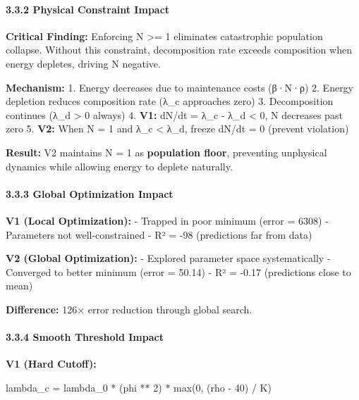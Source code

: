 \documentclass[
]{article}
\newenvironment{Shaded}{}{}
\newcommand{\BuiltInTok}[1]{\textcolor[rgb]{0.00,0.50,0.00}{#1}}
\newcommand{\DecValTok}[1]{\textcolor[rgb]{0.25,0.63,0.44}{#1}}
\newcommand{\NormalTok}[1]{#1}
\newcommand{\OperatorTok}[1]{\textcolor[rgb]{0.40,0.40,0.40}{#1}}
\begin{document}
\paragraph{3.3.2 Physical Constraint
Impact}\label{physical-constraint-impact}

\textbf{Critical Finding:} Enforcing N \textgreater= 1 eliminates
catastrophic population collapse. Without this constraint, decomposition
rate exceeds composition when energy depletes, driving N negative.

\textbf{Mechanism:} 1. Energy decreases due to maintenance costs (β·N·ρ)
2. Energy depletion reduces composition rate (λ\_c approaches zero) 3.
Decomposition continues (λ\_d \textgreater{} 0 always) 4. \textbf{V1:}
dN/dt = λ\_c - λ\_d \textless{} 0, N decreases past zero 5. \textbf{V2:}
When N = 1 and λ\_c \textless{} λ\_d, freeze dN/dt = 0 (prevent
violation)

\textbf{Result:} V2 maintains N = 1 as \textbf{population floor},
preventing unphysical dynamics while allowing energy to deplete
naturally.

\paragraph{3.3.3 Global Optimization
Impact}\label{global-optimization-impact}

\textbf{V1 (Local Optimization):} - Trapped in poor minimum (error =
6308) - Parameters not well-constrained - R² = -98 (predictions far from
data)

\textbf{V2 (Global Optimization):} - Explored parameter space
systematically - Converged to better minimum (error = 50.14) - R² =
-0.17 (predictions close to mean)

\textbf{Difference:} 126× error reduction through global search.

\paragraph{3.3.4 Smooth Threshold Impact}\label{smooth-threshold-impact}

\textbf{V1 (Hard Cutoff):}

\begin{Shaded}
\begin{Highlighting}[]
\NormalTok{lambda\_c }\OperatorTok{=}\NormalTok{ lambda\_0 }\OperatorTok{*}\NormalTok{ (phi }\OperatorTok{**} \DecValTok{2}\NormalTok{) }\OperatorTok{*} \BuiltInTok{max}\NormalTok{(}\DecValTok{0}\NormalTok{, (rho }\OperatorTok{{-}} \DecValTok{40}\NormalTok{) }\OperatorTok{/}\NormalTok{ K)}
\end{Highlighting}
\end{Shaded}
\end{document}
